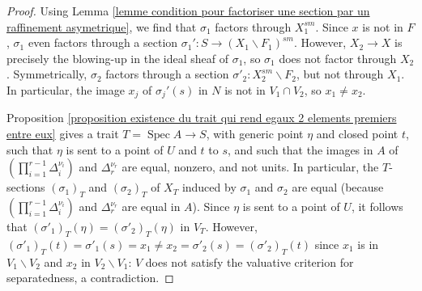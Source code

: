 \documentclass[a4paper,10pt,twoside]{article}
\newcommand{\ra}{\rightarrow}
\DeclareMathOperator{\spec}{Spec}
\theoremstyle{definition}
\theoremstyle{remark}
\begin{document}
\begin{proof}
Using Lemma \ref{lemme condition pour factoriser une section par un raffinement asymetrique}, we find that $\sigma_1$ factors through $X_1^{sm}$. Since $x$ is not in $F$, $\sigma_1$ even factors through a section $\sigma_1'\colon S\ra (X_1\backslash F_1)^{sm}$. However, $X_2\ra X$ is precisely the blowing-up in the ideal sheaf of $\sigma_1$, so $\sigma_1$ does not factor through $X_2$. Symmetrically, $\sigma_2$ factors through a section $\sigma'_2\colon X_2^{sm}\backslash F_2$, but not through $X_1$. In particular, the image $x_j$ of $\sigma_j'(s)$ in $N$ is not in $V_1\cap V_2$, so $x_1\neq x_2$.

Proposition \ref{proposition existence du trait qui rend egaux 2 elements premiers entre eux} gives a trait $T=\spec A\ra S$, with generic point $\eta$ and closed point $t$, such that $\eta$ is sent to a point of $U$ and $t$ to $s$, and such that the images in $A$ of $\left(\prod\limits_{i=1}^{r-1}\Delta_i^{\nu_i}\right)$ and $\Delta_r^{\nu_r}$ are equal, nonzero, and not units. In particular, the $T$-sections $(\sigma_1)_T$ and $(\sigma_2)_T$ of $X_T$ induced by $\sigma_1$ and $\sigma_2$ are equal (because $\left(\prod\limits_{i=1}^{r-1}\Delta_i^{\nu_i}\right)$ and $\Delta_r^{\nu_r}$ are equal in $A$). Since $\eta$ is sent to a point of $U$, it follows that $(\sigma'_1)_T(\eta)=(\sigma'_2)_T(\eta)$ in $V_T$. However, $(\sigma'_1)_T(t)=\sigma'_1(s)=x_1\neq x_2=\sigma'_2(s)=(\sigma'_2)_T(t)$ since $x_1$ is in $V_1\backslash V_2$ and $x_2$ in $V_2\backslash V_1$: $V$ does not satisfy the valuative criterion for separatedness, a contradiction.
\end{proof}
\end{document}
